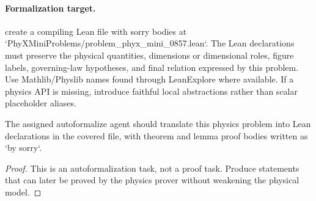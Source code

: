 \paragraph{Formalization target.}
create a compiling Lean file with sorry bodies at `PhyXMiniProblems/problem\_phyx\_mini\_0857.lean`. The Lean declarations must preserve the physical quantities, dimensions or dimensional roles, figure labels, governing-law hypotheses, and final relation expressed by this problem.
Use Mathlib/Physlib names found through LeanExplore where available. If a physics API is missing, introduce faithful local abstractions rather than scalar placeholder aliases.

\begin{theorem}
\label{thm:physics:phyx_mini_0857:target}
The assigned autoformalize agent should translate this physics problem into Lean declarations in the covered file, with theorem and lemma proof bodies written as `by sorry`.
\end{theorem}
\begin{proof}
This is an autoformalization task, not a proof task. Produce statements that can later be proved by the physics prover without weakening the physical model.
\end{proof}

